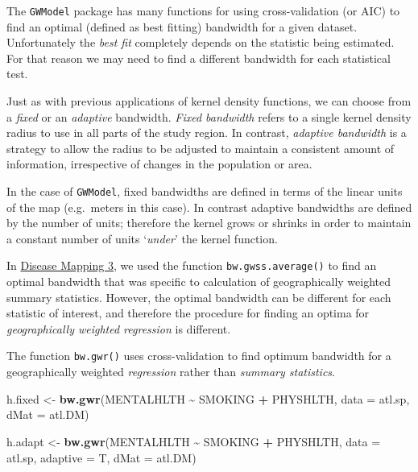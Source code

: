\documentclass[
]{book}
\newenvironment{Shaded}{\begin{snugshade}}{\end{snugshade}}
\newcommand{\AttributeTok}[1]{\textcolor[rgb]{0.13,0.29,0.53}{#1}}
\newcommand{\FunctionTok}[1]{\textcolor[rgb]{0.13,0.29,0.53}{\textbf{#1}}}
\newcommand{\NormalTok}[1]{#1}
\newcommand{\OtherTok}[1]{\textcolor[rgb]{0.56,0.35,0.01}{#1}}
\newcommand{\SpecialCharTok}[1]{\textcolor[rgb]{0.81,0.36,0.00}{\textbf{#1}}}
\begin{document}
The \texttt{GWModel} package has many functions for using cross-validation (or AIC) to find an optimal (defined as best fitting) bandwidth for a given dataset. Unfortunately the \emph{best fit} completely depends on the statistic being estimated. For that reason we may need to find a different bandwidth for each statistical test.

Just as with previous applications of kernel density functions, we can choose from a \emph{fixed} or an \emph{adaptive} bandwidth. \emph{Fixed bandwidth} refers to a single kernel density radius to use in all parts of the study region. In contrast, \emph{adaptive bandwidth} is a strategy to allow the radius to be adjusted to maintain a consistent amount of information, irrespective of changes in the population or area.

In the case of \texttt{GWModel}, fixed bandwidths are defined in terms of the linear units of the map (e.g.~meters in this case). In contrast adaptive bandwidths are defined by the number of units; therefore the kernel grows or shrinks in order to maintain a constant number of units `\emph{under}' the kernel function.

In \protect\hyperlink{gwss}{Disease Mapping 3}, we used the function \texttt{bw.gwss.average()} to find an optimal bandwidth that was specific to calculation of geographically weighted summary statistics. However, the optimal bandwidth can be different for each statistic of interest, and therefore the procedure for finding an optima for \emph{geographically weighted regression} is different.

The function \texttt{bw.gwr()} uses cross-validation to find optimum bandwidth for a geographically weighted \emph{regression} rather than \emph{summary statistics}.

\begin{Shaded}
\begin{Highlighting}[]
\NormalTok{h.fixed }\OtherTok{\textless{}{-}} \FunctionTok{bw.gwr}\NormalTok{(MENTALHLTH }\SpecialCharTok{\textasciitilde{}}\NormalTok{ SMOKING }\SpecialCharTok{+}\NormalTok{ PHYSHLTH, }
             \AttributeTok{data =}\NormalTok{ atl.sp, }
             \AttributeTok{dMat =}\NormalTok{ atl.DM)}

\NormalTok{h.adapt }\OtherTok{\textless{}{-}} \FunctionTok{bw.gwr}\NormalTok{(MENTALHLTH }\SpecialCharTok{\textasciitilde{}}\NormalTok{ SMOKING }\SpecialCharTok{+}\NormalTok{ PHYSHLTH, }
             \AttributeTok{data =}\NormalTok{ atl.sp, }
             \AttributeTok{adaptive =}\NormalTok{ T,}
             \AttributeTok{dMat =}\NormalTok{ atl.DM)}
\end{Highlighting}
\end{Shaded}
\end{document}
